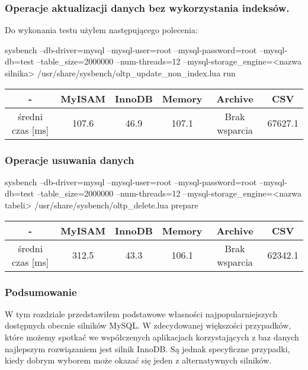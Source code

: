 \subsubsection{Operacje aktualizacji danych bez wykorzystania indeksów.}
Do wykonania testu użyłem następującego polecenia:
\begin{spverbatim}
	sysbench --db-driver=mysql --mysql-user=root --mysql-password=root --mysql-db=test --table_size=2000000 --num-threads=12 --mysql-storage_engine=<nazwa silnika> /usr/share/sysbench/oltp_update_non_index.lua run
	
\end{spverbatim}
\begin{center}
	\begin{tabular}{ | c | c | c | c | c | c |}
		\hline
		- & MyISAM & InnoDB & Memory & Archive & CSV  \\ 
		\hline
		średni czas [ms] & 107.6 & 46.9 & 107.1 & Brak wsparcia & 67627.1 \\
		\hline
	\end{tabular}
\end{center}
\subsubsection{Operacje usuwania danych}

\begin{spverbatim}
	sysbench --db-driver=mysql --mysql-user=root --mysql-password=root --mysql-db=test --table_size=2000000 --num-threads=12 --mysql-storage_engine=<nazwa tabeli>  /usr/share/sysbench/oltp_delete.lua prepare
\end{spverbatim}

\begin{center}
\begin{tabular}{ | c | c | c | c | c | c |}
	\hline
	- & MyISAM & InnoDB & Memory & Archive & CSV  \\ 
	\hline
	średni czas [ms] & 312.5 & 43.3 & 106.1 & Brak wsparcia & 62342.1 \\
	\hline
\end{tabular}
\end{center}


\subsubsection{Podsumowanie}

W tym rozdziale przedstawiłem podstawowe własności najpopularniejszych dostępnych obecnie silników MySQL. W zdecydowanej większości przypadków, które możemy spotkać we współczenych aplikacjach korzystających z baz danych najlepszym rozwiązaniem jest silnik InnoDB. Są jednak specyficzne przypadki, kiedy dobrym wyborem może okazać się jeden z alternatywnych silników.